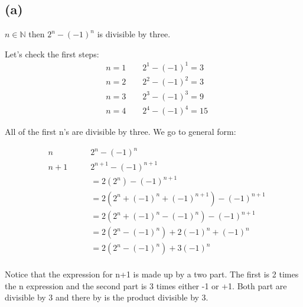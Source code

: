 



\section{}%

\subsection*{(a)}


$n \in \mathbb{N}$ then $2^n - (-1)^n$ is divisible by three.


Let's check the first steps: 
\begin{align*}
&n = 1 \qquad 2^1 - (-1)^1 = 3\\
&n = 2 \qquad 2^2 - (-1)^2 = 3\\
&n = 3 \qquad 2^3 - (-1)^3 = 9\\
&n = 4 \qquad 2^4 - (-1)^4 = 15
\end{align*}

All of the first n's are divisible by three. 
We go to general form: 

\begin{align*}
&n \qquad &2^n - (-1)^n\\
&n+1 \qquad &2^{n+1} - (-1)^{n+1} \\
& &= 2(2^{n}) - (-1)^{n+1}\\
& &= 2(2^{n} + (-1)^n  + (-1)^{n+1}) - (-1)^{n+1}\\
& &= 2(2^{n} + (-1)^n  - (-1)^{n}) - (-1)^{n+1}\\
& &= 2(2^{n}- (-1)^{n}) + 2(-1)^n  + (-1)^{n}\\
& &= 2(2^{n}- (-1)^{n}) + 3(-1)^n \\
\end{align*}

Notice that the expression for n+1 is made up by a two part. The first is 2 times the n expression and the second part is 3 times either -1 or +1. Both part are divisible by 3 and there by is the product divisible by 3. 




%



